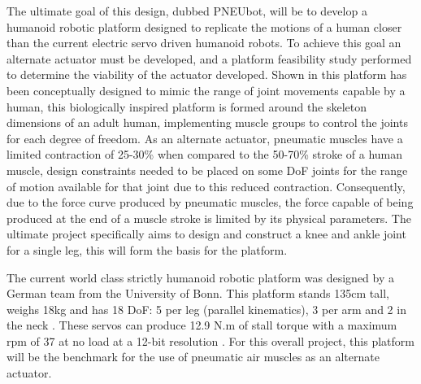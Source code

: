 \documentclass[11pt,a4paper]{article}
\begin{document}
The ultimate goal of this design, dubbed PNEUbot, will be to develop a humanoid robotic platform designed to replicate the motions of a human closer than the current electric servo driven humanoid robots. To achieve this goal an alternate actuator must be developed, and a platform feasibility study performed to determine the viability of the actuator developed. Shown in  this platform has been conceptually designed to mimic the range of joint movements capable by a human, this biologically inspired platform is formed around the skeleton dimensions of an adult human, implementing muscle groups to control the joints for each degree of freedom. As an alternate actuator, pneumatic muscles have a limited contraction of 25-30\% when compared to the 50-70\% stroke of a human muscle, design constraints needed to be placed on some DoF joints for the range of motion available for that joint due to this reduced contraction. Consequently, due to the force curve produced by pneumatic muscles, the force capable of being produced at the end of a muscle stroke is limited by its physical parameters. The ultimate project specifically aims to design and construct a knee and ankle joint for a single leg, this will form the basis for the platform.\newline

The current world class strictly humanoid robotic platform was designed by a German team from the University of Bonn. This platform stands 135cm tall, weighs 18kg and has 18 DoF: 5 per leg (parallel kinematics), 3 per arm and 2 in the neck \cite{ficht_farazi_brandenburger_rodriguez_pavlichenko_allgeuer_hosseini_behnke_2018}. These servos can produce 12.9 N.m of stall torque with a maximum rpm of 37 at no load at a 12-bit resolution \cite{robotis}. For this overall project, this platform will be the benchmark for the use of pneumatic air muscles as an alternate actuator. \newline
\end{document}
